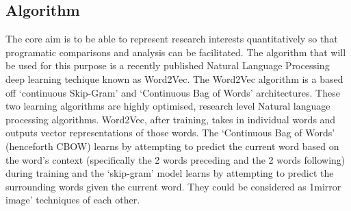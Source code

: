 \documentclass[11pt, oneside]{article}   	%
\begin{document}
\subsection{Algorithm}
The core aim is to be able to represent research interests quantitatively so that programatic comparisons and analysis can be facilitated. The algorithm that will be used for this purpose is a recently published Natural Language Processing deep learning techique known as Word2Vec\cite{WORD2VEC}\cite{PHRASE2VEC}. The Word2Vec algorithm is a based off  `continuous Skip-Gram' and `Continuous Bag of Words' architectures. These two learning algorithms are highly optimised, research level Natural language processing algorithms. Word2Vec, after training, takes in individual words and outputs vector representations of those words. The `Continuous Bag of Words' (henceforth CBOW) learns by attempting to predict the current word based on the word's context (specifically the 2 words preceding and the 2 words following) during training and the `skip-gram' model learns by attempting to predict the surrounding words given the current word. They could be considered as 1mirror image' techniques of each other.
\end{document}
